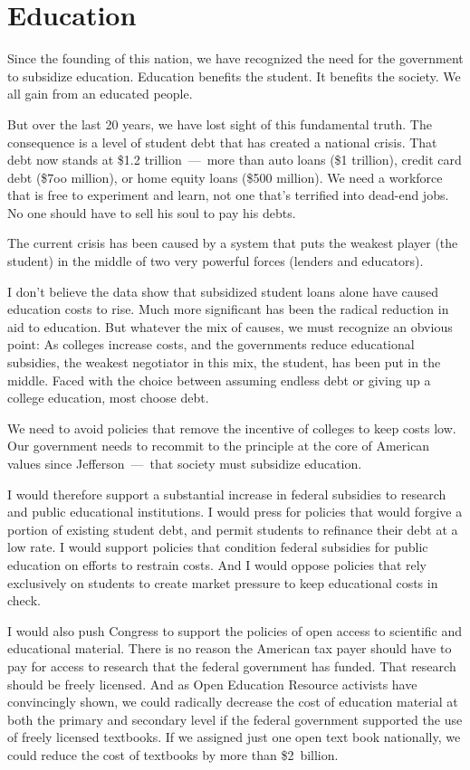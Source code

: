 \section{Education}

Since the founding of this nation, we have recognized the need for the government to subsidize education. Education benefits the student. It benefits the society. We all gain from an educated people.

But over the last 20 years, we have lost sight of this fundamental truth. The consequence is a level of student debt that has created a national crisis. That debt now stands at \$1.2 trillion~---~more than auto loans (\$1 trillion), credit card debt (\$7oo million), or home equity loans (\$500 million). We need a workforce that is free to experiment and learn, not one that's terrified into dead-end jobs. No one should have to sell his soul to pay his debts.

The current crisis has been caused by a system that puts the weakest player (the student) in the middle of two very powerful forces (lenders and educators).

I don't believe the data show that subsidized student loans alone have caused education costs to rise. Much more significant has been the radical reduction in aid to education. But whatever the mix of causes, we must recognize an obvious point: As colleges increase costs, and the governments reduce educational subsidies, the weakest negotiator in this mix, the student, has been put in the middle. Faced with the choice between assuming endless debt or giving up a college education, most choose debt.

We need to avoid policies that remove the incentive of colleges to keep costs low. Our government needs to recommit to the principle at the core of American values since Jefferson~---~that society must subsidize education.

I would therefore support a substantial increase in federal subsidies to research and public educational institutions. I would press for policies that would forgive a portion of existing student debt, and permit students to refinance their debt at a low rate. I would support policies that condition federal subsidies for public education on efforts to restrain costs. And I would oppose policies that rely exclusively on students to create market pressure to keep educational costs in check.

I would also push Congress to support the policies of open access to scientific and educational material. There is no reason the American tax payer should have to pay for access to research that the federal government has funded. That research should be freely licensed. And as Open Education Resource activists have convincingly shown, we could radically decrease the cost of education material at both the primary and secondary level if the federal government supported the use of freely licensed textbooks. If we assigned just one open text book nationally, we could reduce the cost of textbooks by more than \mbox{\$2 billion.}

